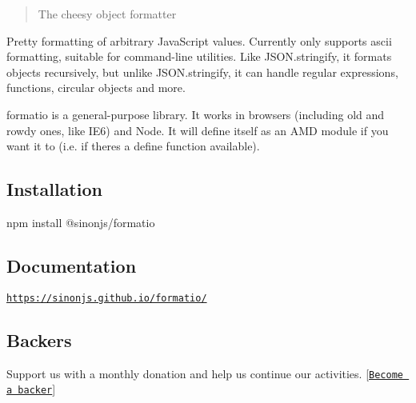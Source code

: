 \href{http://travis-ci.org/sinonjs/formatio}{\tt } \href{https://coveralls.io/github/sinonjs/formatio?branch=master}{\tt }

\begin{quote}
The cheesy object formatter \end{quote}


Pretty formatting of arbitrary Java\+Script values. Currently only supports ascii formatting, suitable for command-\/line utilities. Like {\ttfamily J\+S\+O\+N.\+stringify}, it formats objects recursively, but unlike {\ttfamily J\+S\+O\+N.\+stringify}, it can handle regular expressions, functions, circular objects and more.

{\ttfamily formatio} is a general-\/purpose library. It works in browsers (including old and rowdy ones, like I\+E6) and Node. It will define itself as an A\+MD module if you want it to (i.\+e. if there\textquotesingle{}s a {\ttfamily define} function available).

\subsection*{Installation}


\begin{DoxyCode}
npm install @sinonjs/formatio
\end{DoxyCode}


\subsection*{Documentation}

\href{https://sinonjs.github.io/formatio/}{\tt https\+://sinonjs.\+github.\+io/formatio/}

\subsection*{Backers}

Support us with a monthly donation and help us continue our activities. \mbox{[}\href{https://opencollective.com/sinon#backer}{\tt Become a backer}\mbox{]}

